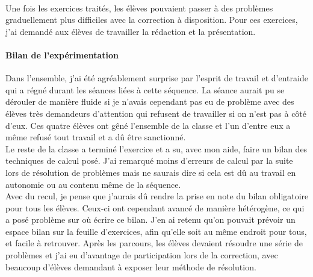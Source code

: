 \paragraph{}Une fois les exercices traités, les élèves pouvaient passer à des problèmes graduellement plus difficiles avec la correction à disposition. Pour ces exercices, j'ai demandé aux élèves de travailler la rédaction et la présentation.

\paragraph{Bilan de l'expérimentation\\}
Dans l'ensemble, j'ai été agréablement surprise par l'esprit de travail et d'entraide qui a régné durant les séances liées à cette séquence. La séance aurait pu se dérouler de manière fluide si je n'avais cependant pas eu de problème avec des élèves très demandeurs d'attention qui refusent de travailler si on n'est pas à côté d'eux. Ces quatre élèves ont gêné l'ensemble de la classe et l'un d'entre eux a même refusé tout travail et a dû être sanctionné.\\
Le reste de la classe a terminé l'exercice et a su, avec mon aide, faire un bilan des techniques de calcul posé. J'ai remarqué moins d'erreurs de calcul par la suite lors de résolution de problèmes mais ne saurais dire si cela est dû au travail en autonomie ou au contenu même de la séquence.\\
Avec du recul, je pense que j'aurais dû rendre la prise en note du bilan obligatoire pour tous les élèves. Ceux-ci ont cependant avancé de manière hétérogène, ce qui a posé problème sur où écrire ce bilan. J'en ai retenu qu'on pouvait prévoir un espace bilan sur la feuille d'exercices, afin qu'elle soit au même endroit pour tous, et facile à retrouver. Après les parcours, les élèves devaient résoudre une série de problèmes et j'ai eu d'avantage de participation lors de la correction, avec beaucoup d'élèves demandant à exposer leur méthode de résolution.
